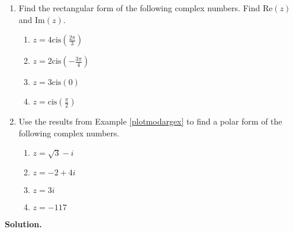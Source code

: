 \documentclass{ximera}
\begin{document}
\begin{example} \label{polarcomplexex} $~$

\begin{enumerate}

\item Find the rectangular form of the following complex numbers. Find $\text{Re}(z)$ and $\text{Im}(z)$.

\begin{multicols}{4}

\begin{enumerate}

\item  $z = 4 \text{cis}\left(\frac{2\pi}{3}\right)$

\item  $z = 2 \text{cis}\left(-\frac{3\pi}{4}\right)$

\item  $z = 3 \text{cis}(0)$

\item  $z = \text{cis}\left(\frac{\pi}{2}\right)$

\end{enumerate}

\end{multicols}

\item  Use the results from Example \ref{plotmodargex} to find a polar form of the following complex numbers.

\begin{multicols}{4}

\begin{enumerate}

\item  $z = \sqrt{3}-i$

\item  $z = -2+4i$

\item  $z = 3i$

\item  $z = -117$

\end{enumerate}

\end{multicols}



\end{enumerate}


{\bf Solution.} 

\begin{enumerate}



\end{enumerate}
\end{example}
\end{document}
